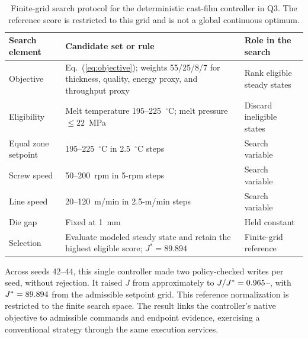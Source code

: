 \begin{table}[!t]
\centering
\caption{Finite-grid search protocol for the deterministic cast-film
controller in Q3. The reference score is restricted to this grid and is not
a global continuous optimum.}
\label{tab:q3search}
\footnotesize
\setlength{\tabcolsep}{4pt}
\begin{tabularx}{\textwidth}{@{}p{2.4cm}Xp{3.0cm}@{}}
\toprule
Search element & Candidate set or rule & Role in the search \\
\midrule
Objective & Eq.~(\ref{eq:objective}); weights 55/25/8/7 for thickness,
quality, energy proxy, and throughput proxy & Rank eligible steady states \\
Eligibility & Melt temperature 195--225~$^{\circ}$C; melt pressure
$\leq 22$~MPa & Discard ineligible states \\
Equal zone setpoint & 195--225~$^{\circ}$C in 2.5~$^{\circ}$C steps & Search variable \\
Screw speed & 50--200~rpm in 5-rpm steps & Search variable \\
Line speed & 20--120~m/min in 2.5-m/min steps & Search variable \\
Die gap & Fixed at 1~mm & Held constant \\
Selection & Evaluate modeled steady state and retain the highest eligible
score; $J^{*}=89.894$ & Finite-grid reference \\
\bottomrule
\end{tabularx}
\end{table}

Across seeds 42--44, this single controller made two policy-checked writes per
seed, without rejection. It raised $J$ from approximately
\resJzero{} to $J/J^*=0.965$--\resControllerMax{}, with
$J^*=89.894$ from the admissible setpoint grid. This reference
normalization is restricted to the finite search space.
The result links the controller's native objective to admissible commands
and endpoint evidence, exercising a conventional strategy through the
same execution services.

